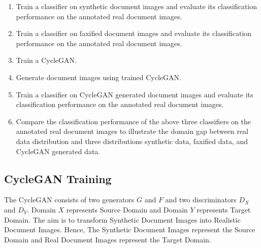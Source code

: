 \begin{enumerate}

    \itemsep0em 
    \item Train a classifier on synthetic document images and evaluate its classification performance on the annotated real document images.
    \item Train a classifier on faxified document images and evaluate its classification performance on the annotated real document images.
    \item Train a \ac{CycleGAN}.
    \item Generate document images using trained \ac{CycleGAN}. 
    \item Train a classifier on \ac{CycleGAN} generated document images and  evaluate its classification performance on the annotated real document images.
    \item Compare the classification performance of the above three classifiers on the annotated real document images to illustrate the domain gap between real data distribution and three distributions synthetic data, faxified data, and \ac{CycleGAN} generated data.

\end{enumerate}




\subsection{\ac{CycleGAN} Training}

The \ac{CycleGAN} consists of two generators $G$ and $F$ and two discriminators $D_X$ and $D_Y$. Domain $X$ represents Source Domain and Domain $Y$ represents Target Domain. The aim is to transform Synthetic Document Images into Realistic Document Images. Hence, The Synthetic Document Images represent the Source Domain and Real Document Images represent the Target Domain.





